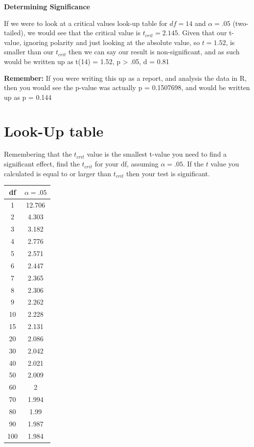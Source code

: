 \documentclass[
  oneside]{book}
\begin{document}
\textbf{Determining Significance}

If we were to look at a critical values look-up table for \(df = 14\) and \(\alpha = .05\) (two-tailed), we would see that the critical value is \(t_{crit} = 2.145\). Given that our t-value, ignoring polarity and just looking at the absolute value, so \(t = 1.52\), is smaller than our \(t_{crit}\) then we can say our result is non-significant, and as such would be written up as t(14) = 1.52, p \textgreater{} .05, d = 0.81

\textbf{Remember:} If you were writing this up as a report, and analysis the data in R, then you would see the p-value was actually p = 0.1507698, and would be written up as p = 0.144

\hypertarget{look-up-table}{%
\section{Look-Up table}\label{look-up-table}}

Remembering that the \(t_{crit}\) value is the smallest t-value you need to find a significant effect, find the \(t_{crit}\) for your df, assuming \(\alpha = .05\). If the \(t\) value you calculated is equal to or larger than \(t_{crit}\) then your test is significant.

\begin{longtable}[]{@{}cc@{}}
\toprule
df & \(\alpha = .05\) \\
\midrule
\endhead
1 & 12.706 \\
2 & 4.303 \\
3 & 3.182 \\
4 & 2.776 \\
5 & 2.571 \\
6 & 2.447 \\
7 & 2.365 \\
8 & 2.306 \\
9 & 2.262 \\
10 & 2.228 \\
15 & 2.131 \\
20 & 2.086 \\
30 & 2.042 \\
40 & 2.021 \\
50 & 2.009 \\
60 & 2 \\
70 & 1.994 \\
80 & 1.99 \\
90 & 1.987 \\
100 & 1.984 \\
\bottomrule
\end{longtable}
\end{document}
